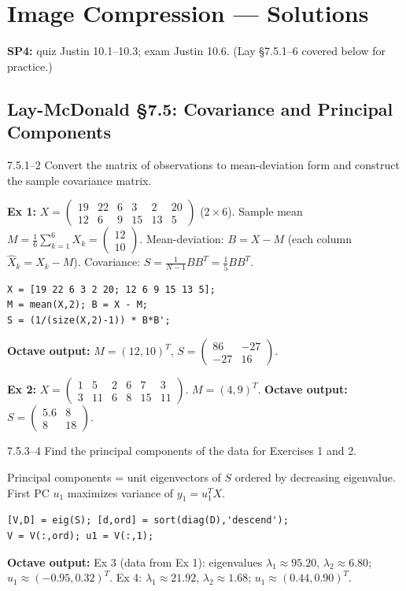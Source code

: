 \chapter{Image Compression --- Solutions}

\noindent\textbf{SP4:} quiz Justin 10.1--10.3; exam Justin 10.6. (Lay \S7.5.1--6 covered below for practice.)

\section*{Lay-McDonald \S7.5: Covariance and Principal Components}

\begin{exercise}{7.5.1--2}
Convert the matrix of observations to mean-deviation form and construct the sample covariance matrix.
\end{exercise}
\begin{solution}
\textbf{Ex 1:} $X=\begin{pmatrix}19&22&6&3&2&20\\12&6&9&15&13&5\end{pmatrix}$ ($2\times6$). Sample mean $M=\frac{1}{6}\sum_{k=1}^6 X_k = \begin{pmatrix}12\\10\end{pmatrix}$. Mean-deviation: $B=X-M$ (each column $\hat{X}_k=X_k-M$). Covariance: $S=\frac{1}{N-1}BB^T=\frac{1}{5}BB^T$.
\begin{lstlisting}
X = [19 22 6 3 2 20; 12 6 9 15 13 5];
M = mean(X,2); B = X - M;
S = (1/(size(X,2)-1)) * B*B';
\end{lstlisting}
\textbf{Octave output:} $M=(12,10)^T$, $S=\begin{pmatrix}86&-27\\-27&16\end{pmatrix}$.

\textbf{Ex 2:} $X=\begin{pmatrix}1&5&2&6&7&3\\3&11&6&8&15&11\end{pmatrix}$. $M=(4,9)^T$. \textbf{Octave output:} $S=\begin{pmatrix}5.6&8\\8&18\end{pmatrix}$.
\end{solution}

\begin{exercise}{7.5.3--4}
Find the principal components of the data for Exercises 1 and 2.
\end{exercise}
\begin{solution}
Principal components = unit eigenvectors of $S$ ordered by decreasing eigenvalue. First PC $u_1$ maximizes variance of $y_1=u_1^TX$.
\begin{lstlisting}
[V,D] = eig(S); [d,ord] = sort(diag(D),'descend');
V = V(:,ord); u1 = V(:,1);
\end{lstlisting}
\textbf{Octave output:} Ex 3 (data from Ex 1): eigenvalues $\lambda_1\approx95.20$, $\lambda_2\approx6.80$; $u_1\approx(-0.95, 0.32)^T$. Ex 4: $\lambda_1\approx21.92$, $\lambda_2\approx1.68$; $u_1\approx(0.44, 0.90)^T$.
\end{solution}

